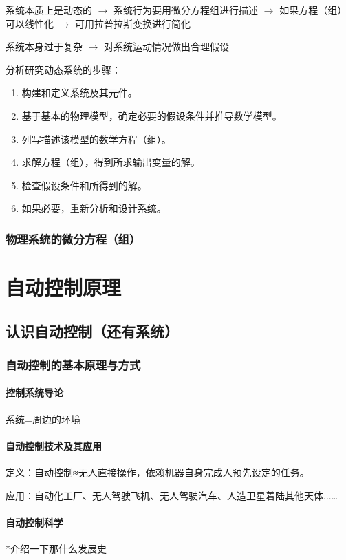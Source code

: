 \documentclass[oneside,a4paper]{ctexbook}
\begin{document}
系统本质上是动态的 $\rightarrow$ 系统行为要用微分方程组进行描述 $\rightarrow$ 如果方程（组）可以线性化 $\rightarrow$ 可用拉普拉斯变换进行简化

系统本身过于复杂 $\rightarrow$ 对系统运动情况做出合理假设

分析研究动态系统的步骤：
\begin{enumerate}
    \item 构建和定义系统及其元件。
    \item 基于基本的物理模型，确定必要的假设条件并推导数学模型。
    \item 列写描述该模型的数学方程（组）。
    \item 求解方程（组），得到所求输出变量的解。
    \item 检查假设条件和所得到的解。
    \item 如果必要，重新分析和设计系统。
\end{enumerate}

\section{物理系统的微分方程（组）}



\part{自动控制原理}
\chapter{认识自动控制（还有系统）}

\section{自动控制的基本原理与方式}
\subsection{控制系统导论}
系统=周边的环境
\subsection{自动控制技术及其应用}
定义：自动控制≈无人直接操作，依赖机器自身完成人预先设定的任务。

应用：自动化工厂、无人驾驶飞机、无人驾驶汽车、人造卫星着陆其他天体...\dots
\subsection{自动控制科学}
*介绍一下那什么发展史
\end{document}
